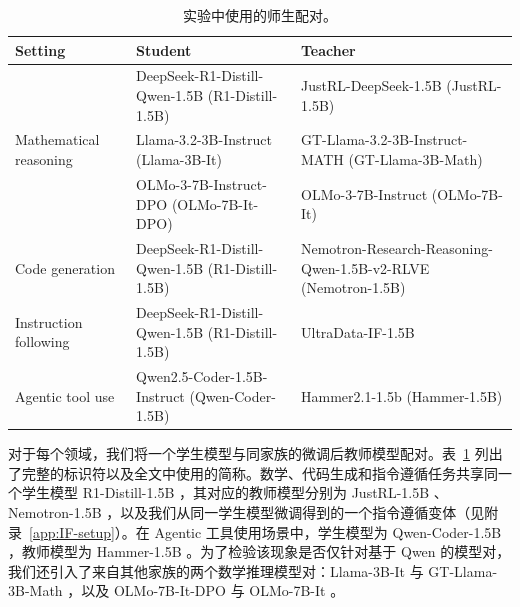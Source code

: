 \begin{table}[t]
\centering
\small
\caption{
实验中使用的师生配对。
}
\label{tab:full}
\setlength{\tabcolsep}{5pt}
\renewcommand{\arraystretch}{1.12}
\begin{tabularx}{\textwidth}{@{}lXX@{}}
\toprule
\textbf{Setting} & \textbf{Student} & \textbf{Teacher} \\
\midrule

\multirow{3}{*}{Mathematical reasoning}
& DeepSeek-R1-Distill-Qwen-1.5B\newline
{\footnotesize (R1-Distill-1.5B)}
& JustRL-DeepSeek-1.5B\newline
{\footnotesize (JustRL-1.5B)} \\

& Llama-3.2-3B-Instruct\newline
{\footnotesize (Llama-3B-It)}
& GT-Llama-3.2-3B-Instruct-MATH\newline
{\footnotesize (GT-Llama-3B-Math)} \\

& OLMo-3-7B-Instruct-DPO\newline
{\footnotesize (OLMo-7B-It-DPO)}
& OLMo-3-7B-Instruct\newline
{\footnotesize (OLMo-7B-It)} \\

\midrule

Code generation
& DeepSeek-R1-Distill-Qwen-1.5B\newline
{\footnotesize (R1-Distill-1.5B)}
& Nemotron-Research-Reasoning-Qwen-1.5B-v2-RLVE\newline
{\footnotesize (Nemotron-1.5B)} \\

Instruction following
& DeepSeek-R1-Distill-Qwen-1.5B\newline
{\footnotesize (R1-Distill-1.5B)}
& UltraData-IF-1.5B \\

Agentic tool use
& Qwen2.5-Coder-1.5B-Instruct\newline
{\footnotesize (Qwen-Coder-1.5B)}
& Hammer2.1-1.5b\newline
{\footnotesize (Hammer-1.5B)} \\

\bottomrule
\end{tabularx}
\end{table}

对于每个领域，我们将一个学生模型与同家族的微调后教师模型配对。表~\ref{tab:full} 列出了完整的标识符以及全文中使用的简称。数学、代码生成和指令遵循任务共享同一个学生模型 R1-Distill-1.5B \citep{deepseekai2025deepseekr1incentivizingreasoningcapability}，其对应的教师模型分别为 JustRL-1.5B \citep{he2025justrl}、Nemotron-1.5B \citep{zeng2025rlve}，以及我们从同一学生模型微调得到的一个指令遵循变体（见附录~\ref{app:IF-setup}）。在 Agentic 工具使用场景中，学生模型为 Qwen-Coder-1.5B \citep{hui2024qwen2}，教师模型为 Hammer-1.5B \citep{lin2024hammer}。为了检验该现象是否仅针对基于 Qwen 的模型对，我们还引入了来自其他家族的两个数学推理模型对：Llama-3B-It \citep{grattafiori2024llama} 与 GT-Llama-3B-Math \citep{zhang2025co}，以及 OLMo-7B-It-DPO 与 OLMo-7B-It \citep{olmo2025olmo}。

